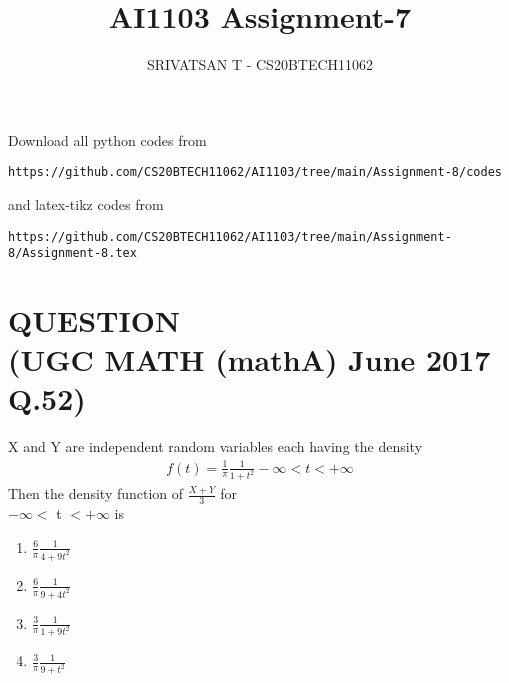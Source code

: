\documentclass[journal,12pt,twocolumn]{IEEEtran}
\begin{document}
    \def\midbox#1{\raisebox{-0.5\baselineskip}[0in][0in]{#1}}
    \vspace{3cm}
    \title{AI1103 Assignment-7}
    \author{SRIVATSAN T - CS20BTECH11062}
    \maketitle
    \newpage
    \bigskip
    \renewcommand{\thefigure}{\theenumi}
    \renewcommand{\thetable}{\theenumi}
    Download all python codes from
    \begin{lstlisting}
https://github.com/CS20BTECH11062/AI1103/tree/main/Assignment-8/codes
\end{lstlisting}
    and latex-tikz codes from
    \begin{lstlisting}
https://github.com/CS20BTECH11062/AI1103/tree/main/Assignment-8/Assignment-8.tex
\end{lstlisting}
    \section*{QUESTION\\(UGC MATH (mathA) June 2017 Q.52)}
    X and Y are independent random variables each having the density
    \begin{align}
        f(t) = \displaystyle\frac{1}{\pi} \frac{1}{1+{t}^2} -\infty < t < +\infty
    \end{align}
    Then the density function of $\displaystyle\frac{X+Y}{3}$ for \\$-\infty <$ t $< +\infty$ is\bigskip
        \begin{enumerate}\itemsep0.5cm
            \item $\displaystyle\frac{6}{\pi} \frac{1}{4+9{t}^2}$
            \item $\displaystyle\frac{6}{\pi} \frac{1}{9+4{t}^2}$
            \item $\displaystyle\frac{3}{\pi} \frac{1}{1+9{t}^2}$
            \item $\displaystyle\frac{3}{\pi} \frac{1}{9+{t}^2}$
        \end{enumerate}
\end{document}
